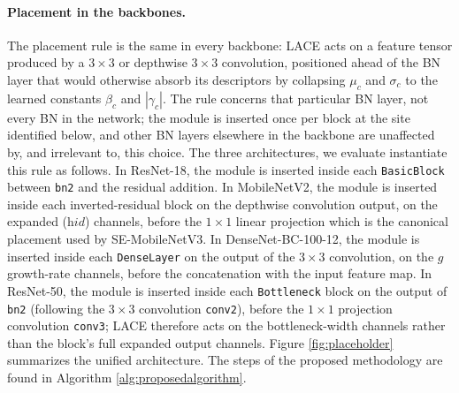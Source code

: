\documentclass{bmvc2k}
\begin{document}
\paragraph{Placement in the backbones.} The placement rule is the same in every backbone: LACE acts on a feature tensor produced by a $3{\times}3$ or depthwise $3{\times}3$ convolution, positioned ahead of the BN layer that would otherwise absorb its descriptors by collapsing $\mu_c$ and $\sigma_c$ to the learned constants $\beta_c$ and $|\gamma_c|$. The rule concerns that particular BN layer, not every BN in the network; the module is inserted once per block at the site identified below, and other BN layers elsewhere in the backbone are unaffected by, and irrelevant to, this choice. The three architectures, we evaluate instantiate this rule as follows. In ResNet-18, the module is inserted inside each \texttt{BasicBlock} between \texttt{bn2} and the residual addition. In MobileNetV2, the module is inserted inside each inverted-residual block on the depthwise convolution output, on the expanded ($\textit{hid}$) channels, before the $1{\times}1$ linear projection which is the canonical placement used by SE-MobileNetV3. In DenseNet-BC-100-12, the module is inserted inside each \texttt{DenseLayer} on the output of the $3{\times}3$ convolution, on the $g$ growth-rate channels, before the concatenation with the input feature map. In ResNet-50, the module is inserted inside each \texttt{Bottleneck} block on the output of \texttt{bn2} (following the $3{\times}3$ convolution \texttt{conv2}), before the $1{\times}1$ projection convolution \texttt{conv3}; LACE therefore acts on the bottleneck-width channels rather than the block's full expanded output channels. Figure \ref{fig:placeholder} summarizes the unified architecture. The steps of the proposed methodology are found in Algorithm \ref{alg:proposedalgorithm}.
\end{document}
